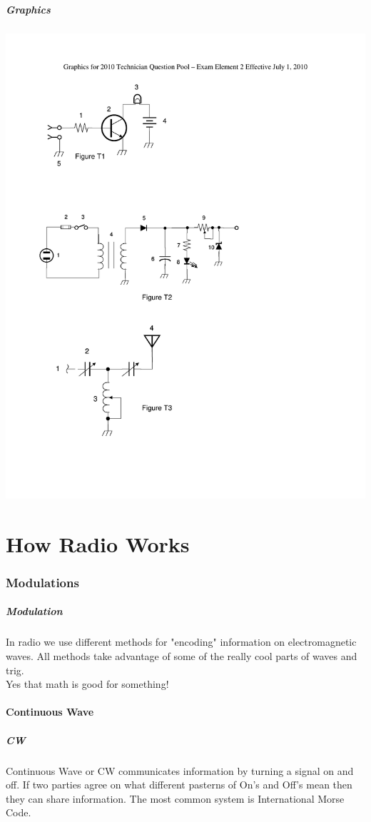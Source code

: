 \documentclass[10pt]{beamer}
\begin{document}
\begin{frame}
\frametitle{Graphics}
\includegraphics[pages={1},height=.9\textheight]{2010element2graphics.pdf}
\end{frame}

\part{How Radio Works}
\section{Modulations}
\begin{frame}
\frametitle{Modulation}
In radio we use different methods for "encoding" information on electromagnetic waves. All methods take advantage of some of the really cool parts of waves and trig.\\
Yes that math is good for something!
\end{frame}


\subsection{Continuous Wave}
\begin{frame}
\frametitle{CW}
Continuous Wave or CW communicates information by turning a signal on and off. If two parties agree on what different pasterns of On's and Off's mean then they can share information. The most common system is International Morse Code. 
\end{frame}
\end{document}
